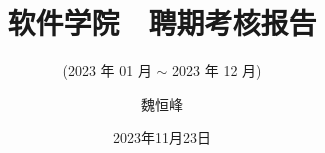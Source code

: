 \documentclass[]{beamer}
\title[]{软件学院 $\;$ 聘期考核报告}
\subtitle{(2023 年 01 月 $\sim$ 2023 年 12 月)}
\author[魏恒峰]{魏恒峰}
\institute{hfwei@nju.edu.cn}
\date{2023年11月23日}
\begin{document}
\maketitle





\thankyou{}
\end{document}
